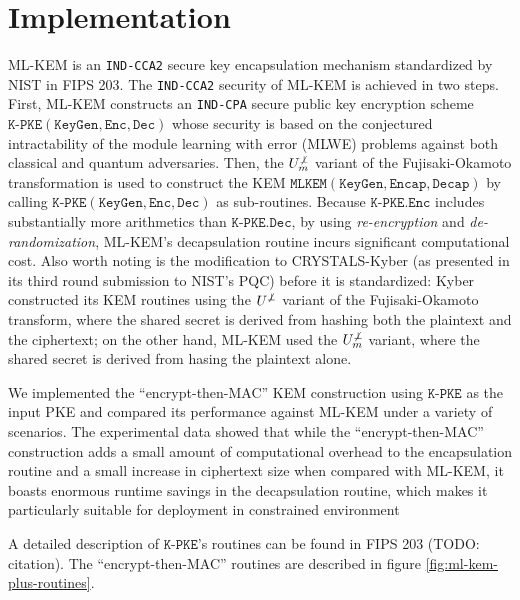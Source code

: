 \documentclass[journal=tches,submission]{iacrtrans}
\newcommand{\keygen}{\texttt{KeyGen}}
\newcommand{\encrypt}{\texttt{Enc}}
\newcommand{\decrypt}{\texttt{Dec}}
\newcommand{\encap}{\texttt{Encap}}
\newcommand{\decap}{\texttt{Decap}}
\begin{document}
\section{Implementation}\label{sec:implementation}
ML-KEM is an \texttt{IND-CCA2} secure key encapsulation mechanism standardized by NIST in FIPS 203. The \texttt{IND-CCA2} security of ML-KEM is achieved in two steps. First, ML-KEM constructs an \texttt{IND-CPA} secure public key encryption scheme $\texttt{K-PKE}(\keygen, \encrypt, \decrypt)$ whose security is based on the conjectured intractability of the module learning with error (MLWE) problems against both classical and quantum adversaries. Then, the $U^{\not\bot}_m$ variant of the Fujisaki-Okamoto transformation \cite{hofheinz2017modular} is used to construct the KEM $\texttt{MLKEM}(\keygen, \encap, \decap)$ by calling $\texttt{K-PKE}(\keygen, \encrypt, \decrypt)$ as sub-routines. Because $\texttt{K-PKE}.\encrypt$ includes substantially more arithmetics than $\texttt{K-PKE}.\decrypt$, by using \textit{re-encryption} and \textit{de-randomization}, ML-KEM's decapsulation routine incurs significant computational cost. Also worth noting is the modification to CRYSTALS-Kyber (as presented in its third round submission to NIST's PQC) before it is standardized: Kyber constructed its KEM routines using the $U^{\not\bot}$ variant of the Fujisaki-Okamoto transform, where the shared secret is derived from hashing both the plaintext and the ciphertext; on the other hand, ML-KEM used the $U^{\not\bot}_m$ variant, where the shared secret is derived from hasing the plaintext alone.

We implemented the ``encrypt-then-MAC'' KEM construction using $\texttt{K-PKE}$ as the input PKE and compared its performance against ML-KEM under a variety of scenarios. The experimental data showed that while the ``encrypt-then-MAC'' construction adds a small amount of computational overhead to the encapsulation routine and a small increase in ciphertext size when compared with ML-KEM, it boasts enormous runtime savings in the decapsulation routine, which makes it particularly suitable for deployment in constrained environment

A detailed description of $\texttt{K-PKE}$'s routines can be found in FIPS 203 (TODO: citation). The ``encrypt-then-MAC'' routines are described in figure \ref{fig:ml-kem-plus-routines}.
\end{document}
